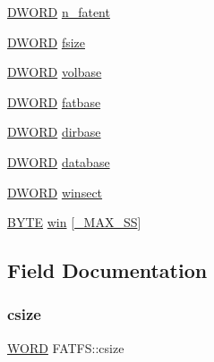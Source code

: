 \begin{DoxyCompactItemize}
\item 
\mbox{\hyperlink{integer_8h_ad342ac907eb044443153a22f964bf0af}{D\+W\+O\+RD}} \mbox{\hyperlink{struct_f_a_t_f_s_a8da50eeba6469bc20d60ca0cf9a1307c}{n\+\_\+fatent}}
\item 
\mbox{\hyperlink{integer_8h_ad342ac907eb044443153a22f964bf0af}{D\+W\+O\+RD}} \mbox{\hyperlink{struct_f_a_t_f_s_a53e9560659f14e66f306c2c444198bf3}{fsize}}
\item 
\mbox{\hyperlink{integer_8h_ad342ac907eb044443153a22f964bf0af}{D\+W\+O\+RD}} \mbox{\hyperlink{struct_f_a_t_f_s_a8f0ca578755749d204f59dc83f1a7649}{volbase}}
\item 
\mbox{\hyperlink{integer_8h_ad342ac907eb044443153a22f964bf0af}{D\+W\+O\+RD}} \mbox{\hyperlink{struct_f_a_t_f_s_a848fba02c4aabe02ef2984e578f33d64}{fatbase}}
\item 
\mbox{\hyperlink{integer_8h_ad342ac907eb044443153a22f964bf0af}{D\+W\+O\+RD}} \mbox{\hyperlink{struct_f_a_t_f_s_a3f72fd998dbcce4652a85a81fe944bc4}{dirbase}}
\item 
\mbox{\hyperlink{integer_8h_ad342ac907eb044443153a22f964bf0af}{D\+W\+O\+RD}} \mbox{\hyperlink{struct_f_a_t_f_s_a5b6c0bc2e9fd2ae8ef714210a74a2d5d}{database}}
\item 
\mbox{\hyperlink{integer_8h_ad342ac907eb044443153a22f964bf0af}{D\+W\+O\+RD}} \mbox{\hyperlink{struct_f_a_t_f_s_ac60e69c00e6bf7c25febfbac4dc1476b}{winsect}}
\item 
\mbox{\hyperlink{lz4_8c_a4ae1dab0fb4b072a66584546209e7d58}{B\+Y\+TE}} \mbox{\hyperlink{struct_f_a_t_f_s_a7cc35a593465e727ab87723c14610644}{win}} \mbox{[}\mbox{\hyperlink{ffconf_8h_ac271b697378912f17132cb9c7d0de024}{\+\_\+\+M\+A\+X\+\_\+\+SS}}\mbox{]}
\end{DoxyCompactItemize}


\subsection{Field Documentation}
\mbox{\label{struct_f_a_t_f_s_ad7fa7a509f8d097a9ab182d6c47be568}} 
\subsubsection{\texorpdfstring{csize}{csize}}
{\footnotesize\ttfamily \mbox{\hyperlink{integer_8h_a197942eefa7db30960ae396d68339b97}{W\+O\+RD}} F\+A\+T\+F\+S\+::csize}

